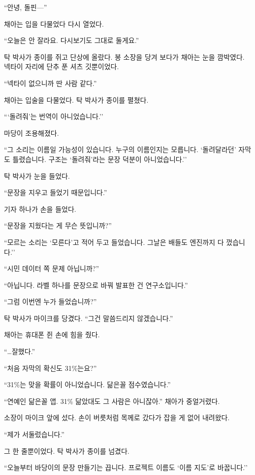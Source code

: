 \documentclass[
  korean,
  letterpaper,
  twoside,
  open=any,
  fontsize=12.5pt,
  headings=small]{scrbook}
\newcommand{\dateline}[1]{\par\noindent{\sffamily\small\color{gray}#1}\par\medskip}
\begin{document}
``안녕, 돌핀---''

채아는 입을 다물었다 다시
열었다.

``오늘은 안 잘라요. 다시보기도
그대로 둘게요.''

\dateline{물멍: 오프닝 어디 감?}

탁 박사가 종이를 쥐고 단상에
올랐다. 봉 소장을 당겨 보다가
채아는 눈을 깜박였다. 넥타이
자리에 단추 푼 셔츠
깃뿐이었다.

``넥타이 없으니까 딴 사람
같다.''

\dateline{물멍: ㅋㅋ 다 들림}

채아는 입술을 다물었다. 탁
박사가 종이를 펼쳤다.

```돌려줘'는 번역이
아니었습니다.''

마당이 조용해졌다.

``그 소리는 이름일 가능성이
있습니다. 누구의 이름인지는
모릅니다. `돌려달라던' 자막도
틀렸습니다. 구조는
`돌려줘'라는 문장 덕분이
아니었습니다.''

탁 박사가 눈을 들었다.

``문장을 지우고 들었기
때문입니다.''

기자 하나가 손을 들었다.

``문장을 지웠다는 게 무슨
뜻입니까?''

``모르는 소리는 `모른다'고
적어 두고 들었습니다. 그날은
배들도 엔진까지 다 껐습니다.''

``시민 데이터 쪽 문제
아닙니까?''

``아닙니다. 라벨 하나를
문장으로 바꿔 발표한 건
연구소입니다.''

``그럼 이번엔 누가
들었습니까?''

탁 박사가 마이크를 당겼다.
``그건 말씀드리지
않겠습니다.''

채아는 휴대폰 쥔 손에 힘을
줬다.

``\ldots 잘했다.''

``처음 자막의 확신도
31\%는요?''

``31\%는 맞을 확률이
아니었습니다. 닮은꼴
점수였습니다.''

``연예인 닮은꼴 앱. 31\%
닮았대도 그 사람은 아니잖아.''
채아가 중얼거렸다.

소장이 마이크 앞에 섰다. 손이
버릇처럼 목께로 갔다가 잡을 게
없어 내려왔다.

``제가 서둘렀습니다.''

그 한 줄뿐이었다. 탁 박사가
종이를 넘겼다.

``오늘부터 바당이의 문장
만들기는 끕니다. 프로젝트
이름도 `이름 지도'로
바꿉니다.''
\end{document}
